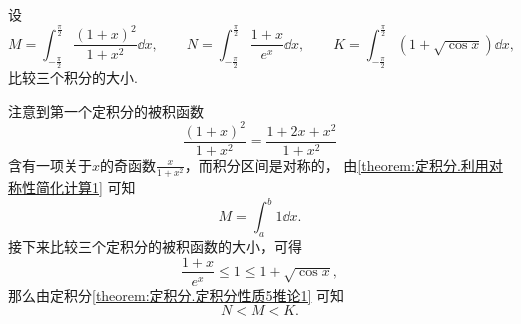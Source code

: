 \begin{example}
设\[
	M = \int_{-\frac\pi2}^{\frac\pi2} \frac{(1+x)^2}{1+x^2} \dd{x},
	\qquad
	N = \int_{-\frac\pi2}^{\frac\pi2} \frac{1+x}{e^x} \dd{x},
	\qquad
	K = \int_{-\frac\pi2}^{\frac\pi2} (1+\sqrt{\cos x}) \dd{x},
\]
比较三个积分的大小.
\begin{solution}
注意到第一个定积分的被积函数\[
	\frac{(1+x)^2}{1+x^2}
	= \frac{1+2x+x^2}{1+x^2}
\]含有一项关于\(x\)的奇函数\(\frac{x}{1+x^2}\)，而积分区间是对称的，
由\cref{theorem:定积分.利用对称性简化计算1} 可知\[
	M = \int_a^b 1 \dd{x}.
\]
接下来比较三个定积分的被积函数的大小，可得\[
	\frac{1+x}{e^x} \leq 1 \leq 1 + \sqrt{\cos x},
\]
那么由定积分\cref{theorem:定积分.定积分性质5推论1} 可知\[
	N < M < K.
\]
\end{solution}
\end{example}

